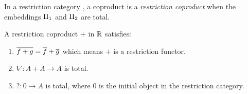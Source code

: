 \begin{definition}\label{def:restriction_coproduct}
  In a restriction category \R, a coproduct is a \emph{restriction coproduct} when the embeddings
  $\amalg_{1}$ and $\amalg_{2}$ are total.
\end{definition}
\begin{lemma}\label{lem:restriction_coproduct_is_restriction_functor}
  A restriction coproduct $+$ in $\mathbb{R}$ satisfies:
  \begin{enumerate}[{(}i{)}]
    \item $\overline{f+g} = \overline{f} + \overline{g}$ which means $+$ is a restriction functor.
    \item $\nabla:A+A\to A$ is total.
    \item $?:0 \to A$ is total, where $0$ is the initial object in the restriction category.
  \end{enumerate}
\end{lemma}
